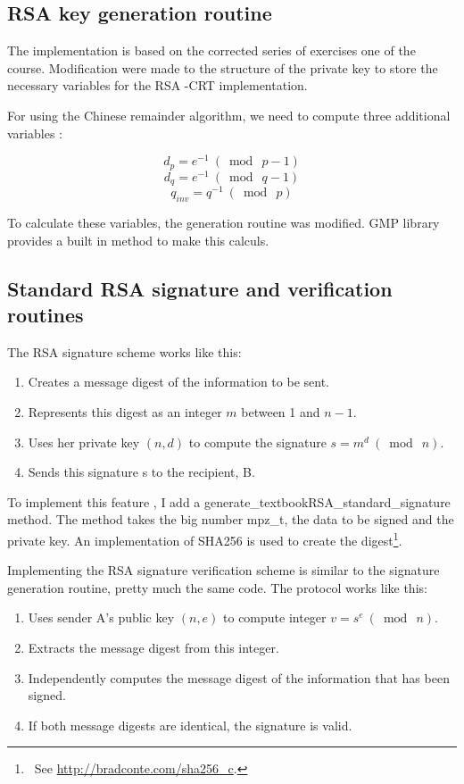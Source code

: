 \documentclass[a4paper]{report}
\begin{document}
\subsection{RSA key generation routine}
The implementation is based on the corrected series of exercises one of the course. Modification were made to the structure of the private key to store the necessary variables for the RSA -CRT implementation.


For using the Chinese remainder algorithm, we need to compute three additional variables :

\[
d_p = e^{-1} \ (\bmod{\ p - 1} )
\]
\[
d_q = e^{-1} \ (\bmod{\ q - 1} )
\]
\[
q_{inv} = q^{-1} \ ( \bmod{\ p} )
\]

To calculate these variables, the generation routine was modified. GMP library provides a built in method to make this calculs. 


\subsection{Standard RSA signature and verification routines}
The RSA signature scheme works like this:
\begin{enumerate}
    \item Creates a message digest of the information to be sent.
    \item Represents this digest as an integer $m$ between 1 and $n-1$.
    \item Uses her private key $(n, d)$ to compute the signature $s = m^d  \ (\bmod{\ n} )$.
    \item Sends this signature s to the recipient, B.
\end{enumerate}

To implement this feature , I add a generate\_textbookRSA\_standard\_signature method. The method takes the big number mpz\_t, the data to be signed and the private key. An implementation of SHA256 is used to create the digest\footnote{\ See \href{http://bradconte.com/sha256\_c}{http://bradconte.com/sha256\_c}.}.


Implementing the RSA signature verification scheme is similar to the signature generation routine, pretty much the same code. The protocol works like this:
\begin{enumerate}
    \item Uses sender A's public key $(n, e)$ to compute integer $v = s^e  \ (\bmod{\ n} )$.
    \item Extracts the message digest from this integer.
    \item Independently computes the message digest of the information that has been signed.
    \item If both message digests are identical, the signature is valid.
\end{enumerate}
\end{document}
